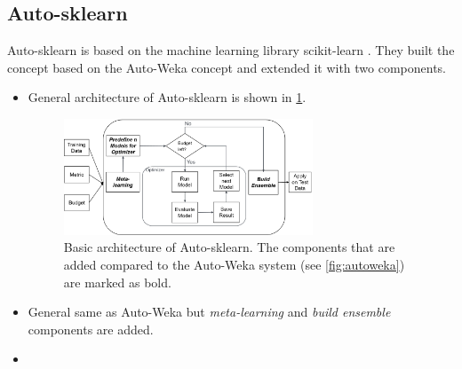 \subsection{Auto-sklearn}
Auto-sklearn \cite{Feurer2015EfficientLearning} is based on the machine learning library scikit-learn \cite{PedregosaFABIANPEDREGOSA2011Scikit-learn:Perrot}.
They built the concept based on the Auto-Weka concept and extended it with two components.
\begin{itemize}
    \item General architecture of Auto-sklearn is shown in \cref{fig:autosklearn}.
    \begin{figure}
        \centering
        \includegraphics[width=0.7\textwidth]{graphics/auto_sklearn_arch.png}
        \caption{Basic architecture of Auto-sklearn. The components that are added compared to the Auto-Weka system (see \cref{fig:autoweka}) are marked as bold.}
        \label{fig:autosklearn}
    \end{figure}
    \item General same as Auto-Weka but \textit{meta-learning} and \textit{build ensemble} components are added.
    \item 
\end{itemize}

